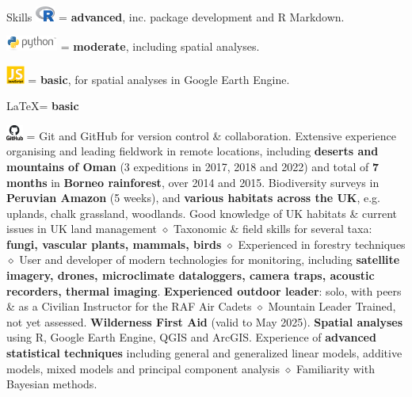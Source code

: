 
\begin{rubric}{Skills}
    \includegraphics[height=0.5cm]{Rlogo.png} = \textbf {advanced}, inc. package development and R Markdown.
    \par \includegraphics[height=0.5cm]{python-logo.png} = \textbf{moderate}, including spatial analyses.
    \par \includegraphics[height=0.6cm]{javascript-logo.jpg} = \textbf{basic}, for spatial analyses in Google Earth Engine.
    \par \LaTeX = \textbf{basic}
    \par \includegraphics[height=0.5cm]{github-logo.png} = Git and GitHub for version control \& collaboration.
\entry*[Fieldwork]
	Extensive experience organising and leading fieldwork in remote locations, including \textbf{deserts and mountains of Oman} (3 expeditions in 2017, 2018 and 2022) and total of \textbf{7 months} in \textbf{Borneo rainforest}, over 2014 and 2015. Biodiversity surveys in \textbf{Peruvian Amazon} (5 weeks), and \textbf{various habitats across the UK}, e.g. uplands, chalk grassland, woodlands.
 Good knowledge of UK habitats \& current issues in UK land management $\diamond$ Taxonomic \& field skills for several taxa: \textbf{fungi, vascular plants, mammals, birds} $\diamond$ Experienced in forestry techniques $\diamond$ User and developer of modern technologies for monitoring, including \textbf{satellite imagery, drones, microclimate dataloggers, camera traps, acoustic recorders, thermal imaging}.
 \textbf{Experienced outdoor leader}: solo, with peers \& as a Civilian Instructor for the RAF Air Cadets $\diamond$ Mountain Leader Trained, not yet assessed.
	\textbf{Wilderness First Aid} (valid to May 2025).
\entry*[GIS]
	\textbf{Spatial analyses} using R, Google Earth Engine, QGIS and ArcGIS.
	Experience of \textbf{advanced statistical techniques} including general and generalized linear models, additive models, mixed models and principal component analysis $\diamond$ Familiarity with Bayesian methods.

\end{rubric}
